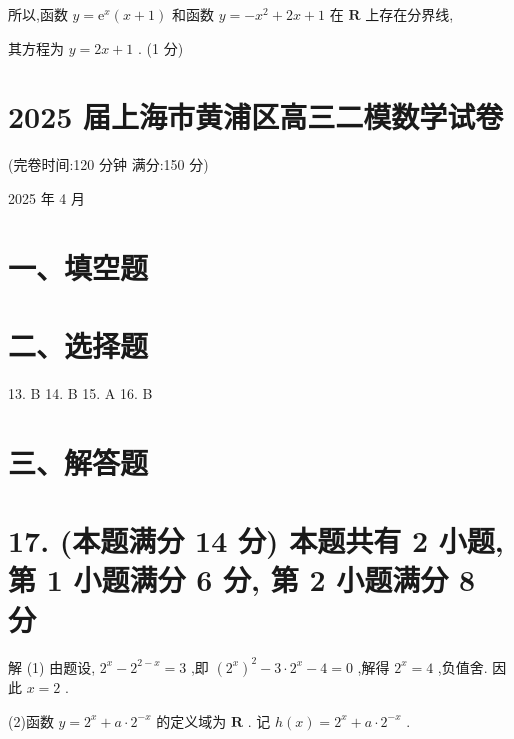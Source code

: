 \documentclass[10pt]{article}
\begin{document}
所以,函数 \(y = {\mathrm{e}}^{x}\left( {x + 1}\right)\) 和函数 \(y =  - {x}^{2} + {2x} + 1\) 在 \(\mathbf{R}\) 上存在分界线,

其方程为 \(y = {2x} + 1\) . (1 分)

\section*{2025 届上海市黄浦区高三二模数学试卷}

(完卷时间:120 分钟 满分:150 分)

2025 年 4 月

\section*{一、填空题}

\begin{center}
\end{center}

\section*{二、选择题}

13. B 14. B 15. A 16. B

\section*{三、解答题}

\section*{17. (本题满分 14 分) 本题共有 2 小题, 第 1 小题满分 6 分, 第 2 小题满分 8 分}

解 (1) 由题设, \({2}^{x} - {2}^{2 - x} = 3\) ,即 \({\left( {2}^{x}\right) }^{2} - 3 \cdot  {2}^{x} - 4 = 0\) ,解得 \({2}^{x} = 4\) ,负值舍. 因此 \(x = 2\) .

(2)函数 \(y = {2}^{x} + a \cdot  {2}^{-x}\) 的定义域为 \(\mathbf{R}\) . 记 \(h\left( x\right)  = {2}^{x} + a \cdot  {2}^{-x}\) .
\end{document}
